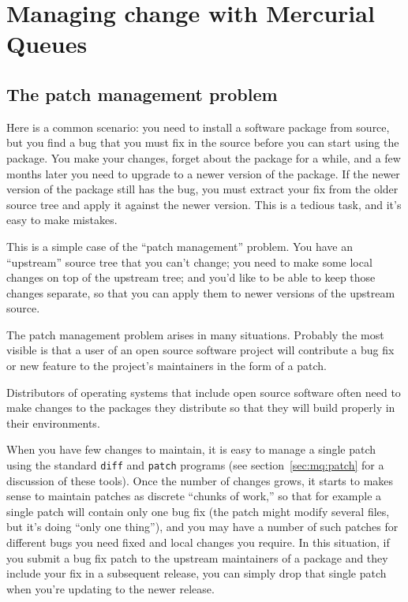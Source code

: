 \chapter{Managing change with Mercurial Queues}
\label{chap:mq}

\section{The patch management problem}
\label{sec:mq:patch-mgmt}

Here is a common scenario: you need to install a software package from
source, but you find a bug that you must fix in the source before you
can start using the package.  You make your changes, forget about the
package for a while, and a few months later you need to upgrade to a
newer version of the package.  If the newer version of the package
still has the bug, you must extract your fix from the older source
tree and apply it against the newer version.  This is a tedious task,
and it's easy to make mistakes.

This is a simple case of the ``patch management'' problem.  You have
an ``upstream'' source tree that you can't change; you need to make
some local changes on top of the upstream tree; and you'd like to be
able to keep those changes separate, so that you can apply them to
newer versions of the upstream source.

The patch management problem arises in many situations.  Probably the
most visible is that a user of an open source software project will
contribute a bug fix or new feature to the project's maintainers in the
form of a patch.

Distributors of operating systems that include open source software
often need to make changes to the packages they distribute so that
they will build properly in their environments.

When you have few changes to maintain, it is easy to manage a single
patch using the standard \texttt{diff} and \texttt{patch} programs
(see section~\ref{sec:mq:patch} for a discussion of these tools).
Once the number of changes grows, it starts to makes sense to maintain
patches as discrete ``chunks of work,'' so that for example a single
patch will contain only one bug fix (the patch might modify several
files, but it's doing ``only one thing''), and you may have a number
of such patches for different bugs you need fixed and local changes
you require.  In this situation, if you submit a bug fix patch to the
upstream maintainers of a package and they include your fix in a
subsequent release, you can simply drop that single patch when you're
updating to the newer release.

